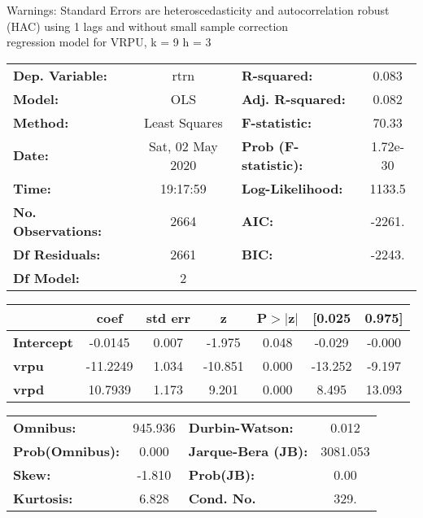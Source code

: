 Warnings: \newline
 [1] Standard Errors are heteroscedasticity and autocorrelation robust (HAC) using 1 lags and without small sample correction\\ 

regression model for VRPU, k = 9 h = 3\begin{center}
\begin{tabular}{lclc}
\toprule
\textbf{Dep. Variable:}    &       rtrn       & \textbf{  R-squared:         } &     0.083   \\
\textbf{Model:}            &       OLS        & \textbf{  Adj. R-squared:    } &     0.082   \\
\textbf{Method:}           &  Least Squares   & \textbf{  F-statistic:       } &     70.33   \\
\textbf{Date:}             & Sat, 02 May 2020 & \textbf{  Prob (F-statistic):} &  1.72e-30   \\
\textbf{Time:}             &     19:17:59     & \textbf{  Log-Likelihood:    } &    1133.5   \\
\textbf{No. Observations:} &        2664      & \textbf{  AIC:               } &    -2261.   \\
\textbf{Df Residuals:}     &        2661      & \textbf{  BIC:               } &    -2243.   \\
\textbf{Df Model:}         &           2      & \textbf{                     } &             \\
\bottomrule
\end{tabular}
\begin{tabular}{lcccccc}
                   & \textbf{coef} & \textbf{std err} & \textbf{z} & \textbf{P$> |$z$|$} & \textbf{[0.025} & \textbf{0.975]}  \\
\midrule
\textbf{Intercept} &      -0.0145  &        0.007     &    -1.975  &         0.048        &       -0.029    &       -0.000     \\
\textbf{vrpu}      &     -11.2249  &        1.034     &   -10.851  &         0.000        &      -13.252    &       -9.197     \\
\textbf{vrpd}      &      10.7939  &        1.173     &     9.201  &         0.000        &        8.495    &       13.093     \\
\bottomrule
\end{tabular}
\begin{tabular}{lclc}
\textbf{Omnibus:}       & 945.936 & \textbf{  Durbin-Watson:     } &    0.012  \\
\textbf{Prob(Omnibus):} &   0.000 & \textbf{  Jarque-Bera (JB):  } & 3081.053  \\
\textbf{Skew:}          &  -1.810 & \textbf{  Prob(JB):          } &     0.00  \\
\textbf{Kurtosis:}      &   6.828 & \textbf{  Cond. No.          } &     329.  \\
\bottomrule
\end{tabular}
\end{center}

